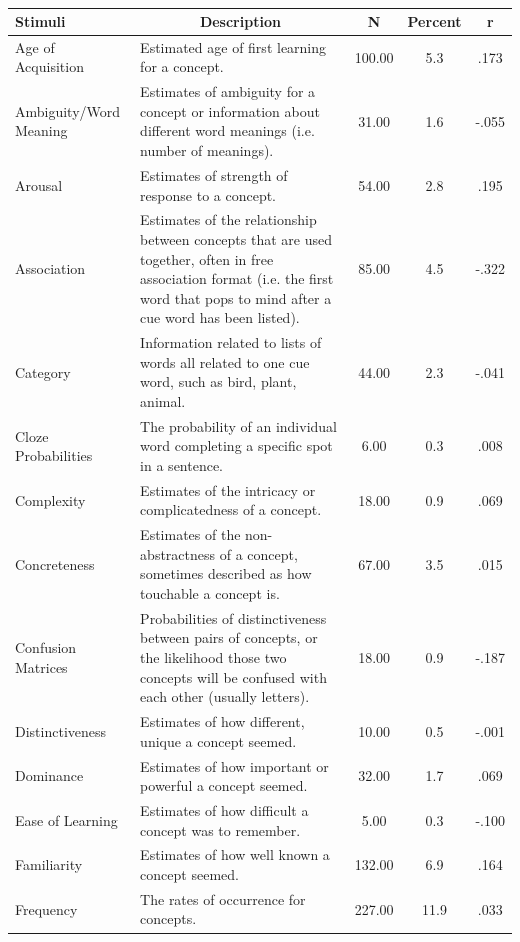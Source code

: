 \documentclass[english,man]{apa6}
\theoremstyle{definition}
\theoremstyle{definition}
\theoremstyle{definition}
\theoremstyle{remark}
\begin{document}
\begin{table}[tbp]
\begin{center}
\begin{threeparttable}
\caption{\label{tab:tag-table}}
\begin{tabular}{llccc}
\toprule
Stimuli & \multicolumn{1}{c}{Description} & \multicolumn{1}{c}{N} & \multicolumn{1}{c}{Percent} & \multicolumn{1}{c}{r}\\
\midrule
Age of Acquisition & Estimated age of first learning for a concept. & 100.00 & 5.3 & .173\\
Ambiguity/Word Meaning & Estimates of ambiguity for a concept or information about different word meanings (i.e. number of meanings). & 31.00 & 1.6 & -.055\\
Arousal & Estimates of strength of response to a concept. & 54.00 & 2.8 & .195\\
Association & Estimates of the relationship between concepts that are used together, often in free association format (i.e. the first word that pops to mind after a cue word has been listed). & 85.00 & 4.5 & -.322\\
Category & Information related to lists of words all related to one cue word, such as bird, plant, animal. & 44.00 & 2.3 & -.041\\
Cloze Probabilities & The probability of an individual word completing a specific spot in a sentence. & 6.00 & 0.3 & .008\\
Complexity & Estimates of the intricacy or complicatedness of a concept. & 18.00 & 0.9 & .069\\
Concreteness & Estimates of the non-abstractness of a concept, sometimes described as how touchable a concept is. & 67.00 & 3.5 & .015\\
Confusion Matrices & Probabilities of distinctiveness between pairs of concepts, or the likelihood those two concepts will be confused with each other (usually letters). & 18.00 & 0.9 & -.187\\
Distinctiveness & Estimates of how different, unique a concept seemed. & 10.00 & 0.5 & -.001\\
Dominance & Estimates of how important or powerful a concept seemed. & 32.00 & 1.7 & .069\\
Ease of Learning & Estimates of how difficult a concept was to remember. & 5.00 & 0.3 & -.100\\
Familiarity & Estimates of how well known a concept seemed. & 132.00 & 6.9 & .164\\
Frequency & The rates of occurrence for concepts. & 227.00 & 11.9 & .033\\

\end{tabular}
\end{threeparttable}
\end{center}
\end{table}
\end{document}
